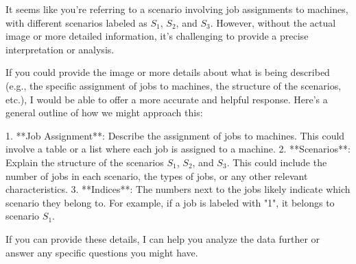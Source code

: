 It seems like you're referring to a scenario involving job assignments to machines, with different scenarios labeled as \( S_1 \), \( S_2 \), and \( S_3 \). However, without the actual image or more detailed information, it's challenging to provide a precise interpretation or analysis.

If you could provide the image or more details about what is being described (e.g., the specific assignment of jobs to machines, the structure of the scenarios, etc.), I would be able to offer a more accurate and helpful response. Here’s a general outline of how we might approach this:

1. **Job Assignment**: Describe the assignment of jobs to machines. This could involve a table or a list where each job is assigned to a machine.
2. **Scenarios**: Explain the structure of the scenarios \( S_1 \), \( S_2 \), and \( S_3 \). This could include the number of jobs in each scenario, the types of jobs, or any other relevant characteristics.
3. **Indices**: The numbers next to the jobs likely indicate which scenario they belong to. For example, if a job is labeled with "1", it belongs to scenario \( S_1 \).

If you can provide these details, I can help you analyze the data further or answer any specific questions you might have.